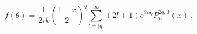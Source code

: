 \begin{equation}
\label{F}
f(\theta)=\frac1{2ik}\left(\frac{1-x}2\right)^q\sum_{l=|q|}^\infty(2l+1)
e^{2i\delta_l}P_n^{2q,0}(x) \ ,
\end{equation}

